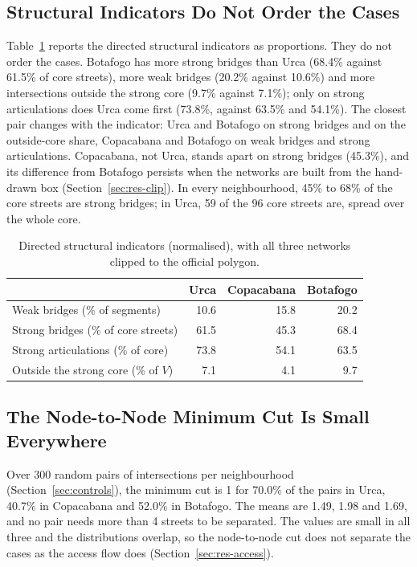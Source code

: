 \documentclass[runningheads]{llncs}
\begin{document}
\subsection{Structural Indicators Do Not Order the Cases}
\label{sec:res-struct}

Table~\ref{tab:estrutural} reports the directed structural indicators as
proportions. They do not order the cases. Botafogo has more strong bridges than
Urca (68.4\% against 61.5\% of core streets), more weak bridges (20.2\% against
10.6\%) and more intersections outside the strong core (9.7\% against 7.1\%);
only on strong articulations does Urca come first (73.8\%, against 63.5\% and
54.1\%). The closest pair changes with the indicator: Urca and Botafogo on
strong bridges and on the outside-core share, Copacabana and Botafogo on weak
bridges and strong articulations. Copacabana, not Urca, stands apart on strong
bridges (45.3\%), and its difference from Botafogo persists when the networks
are built from the hand-drawn box (Section~\ref{sec:res-clip}). In every
neighbourhood, 45\% to 68\% of the core streets are strong bridges; in Urca, 59
of the 96 core streets are, spread over the whole core.

\begin{table}[t]
\centering
\caption{Directed structural indicators (normalised), with all three
networks clipped to the official polygon.}
\label{tab:estrutural}
\begin{tabular}{lrrr}
\toprule
 & Urca & Copacabana & Botafogo \\
\midrule
Weak bridges (\% of segments)       & 10.6 & 15.8 & 20.2 \\
Strong bridges (\% of core streets) & 61.5 & 45.3 & 68.4 \\
Strong articulations (\% of core)   & 73.8 & 54.1 & 63.5 \\
Outside the strong core (\% of $V$) & 7.1  & 4.1  & 9.7 \\
\bottomrule
\end{tabular}
\end{table}

\subsection{The Node-to-Node Minimum Cut Is Small Everywhere}
\label{sec:res-mincut}

Over 300 random pairs of intersections per neighbourhood
(Section~\ref{sec:controls}), the minimum cut is 1 for 70.0\% of the pairs in
Urca, 40.7\% in Copacabana and 52.0\% in Botafogo. The means are 1.49, 1.98 and
1.69, and no pair needs more than 4 streets to be separated. The values are
small in all three and the distributions overlap, so the node-to-node cut does
not separate the cases as the access flow does (Section~\ref{sec:res-access}).
\end{document}
